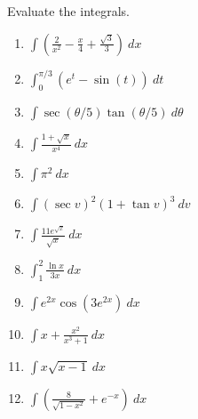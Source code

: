 \documentclass[12pt]{article}
\newcommand{\ds}{\displaystyle}
\begin{document}
Evaluate the integrals. %
\begin{enumerate}
\item $\ds \int \left(\frac{2}{x^2}-\frac{x}{4}+\frac{\sqrt{3}}{3} \right) \ dx $ \vfill
\item $\ds \int_0^{\pi/3} \left(e^t-\sin(t)\right) \ dt $ \vfill
\item $\ds \int \sec(\theta/5) \tan(\theta/5)\ d\theta $\vfill
\newpage

\item $\ds \int \frac{1+\sqrt{x}}{x^4}\ dx $\vfill
 \item $\ds \int \pi^2 \ dx $\vfill
\item $\ds \int (\sec v)^{2} (1+\tan{v})^3\ dv $ \vfill

\newpage
\item $\ds \int  \frac{11e^{\sqrt{x}}}{\sqrt{x}} \ dx $  \vfill

\item $\ds \int_1^2 \frac{\ln x}{3x}\ dx $ \vfill
\item $\ds \int e^{2x}\cos(3e^{2x})\ dx $ \vfill
\newpage
\item $\ds \int x+ \frac{x^2}{x^3+1}\ dx $ \vfill
\item $\ds \int x\sqrt{x-1}\ dx $ \vfill

\item $\ds \int \left(\frac{8}{\sqrt{1-x^2}  } +e^{-x}\right)\ dx $ \vfill




\end{enumerate}
\end{document}
